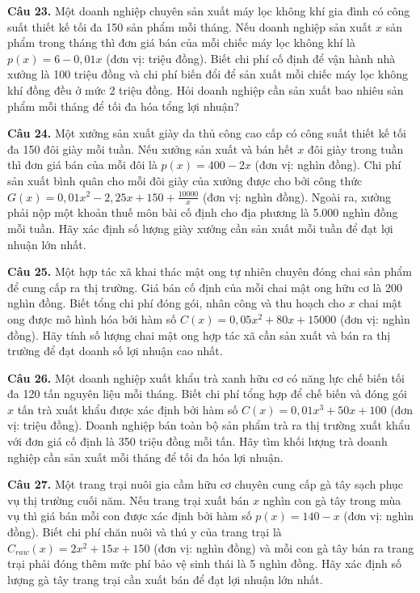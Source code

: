 \documentclass[12pt]{article}
\begin{document}
	\vspace{0.6cm}
	\noindent \textbf{Câu 23.} Một doanh nghiệp chuyên sản xuất máy lọc không khí gia đình có công suất thiết kế tối đa 150 sản phẩm mỗi tháng. Nếu doanh nghiệp sản xuất $x$ sản phẩm trong tháng thì đơn giá bán của mỗi chiếc máy lọc không khí là $p(x) = 6 - 0,01x$ (đơn vị: triệu đồng). Biết chi phí cố định để vận hành nhà xưởng là 100 triệu đồng và chi phí biến đổi để sản xuất mỗi chiếc máy lọc không khí đồng đều ở mức 2 triệu đồng. Hỏi doanh nghiệp cần sản xuất bao nhiêu sản phẩm mỗi tháng để tối đa hóa tổng lợi nhuận?
	
	\vspace{0.6cm}
	\noindent \textbf{Câu 24.} Một xưởng sản xuất giày da thủ công cao cấp có công suất thiết kế tối đa 150 đôi giày mỗi tuần. Nếu xưởng sản xuất và bán hết $x$ đôi giày trong tuần thì đơn giá bán của mỗi đôi là $p(x) = 400 - 2x$ (đơn vị: nghìn đồng). Chi phí sản xuất bình quân cho mỗi đôi giày của xưởng được cho bởi công thức $G(x) = 0,01x^2 - 2,25x + 150 + \frac{10000}{x}$ (đơn vị: nghìn đồng). Ngoài ra, xưởng phải nộp một khoản thuế môn bài cố định cho địa phương là 5.000 nghìn đồng mỗi tuần. Hãy xác định số lượng giày xưởng cần sản xuất mỗi tuần để đạt lợi nhuận lớn nhất.
	
	\vspace{0.6cm}
	\noindent \textbf{Câu 25.} Một hợp tác xã khai thác mật ong tự nhiên chuyên đóng chai sản phẩm để cung cấp ra thị trường. Giá bán cố định của mỗi chai mật ong hữu cơ là 200 nghìn đồng. Biết tổng chi phí đóng gói, nhân công và thu hoạch cho $x$ chai mật ong được mô hình hóa bởi hàm số $C(x) = 0,05x^2 + 80x + 15000$ (đơn vị: nghìn đồng). Hãy tính số lượng chai mật ong hợp tác xã cần sản xuất và bán ra thị trường để đạt doanh số lợi nhuận cao nhất.
	
	\vspace{0.6cm}
	\noindent \textbf{Câu 26.} Một doanh nghiệp xuất khẩu trà xanh hữu cơ có năng lực chế biến tối đa 120 tấn nguyên liệu mỗi tháng. Biết chi phí tổng hợp để chế biến và đóng gói $x$ tấn trà xuất khẩu được xác định bởi hàm số $C(x) = 0,01x^3 + 50x + 100$ (đơn vị: triệu đồng). Doanh nghiệp bán toàn bộ sản phẩm trà ra thị trường xuất khẩu với đơn giá cố định là 350 triệu đồng mỗi tấn. Hãy tìm khối lượng trà doanh nghiệp cần sản xuất mỗi tháng để tối đa hóa lợi nhuận.
	
	\vspace{0.6cm}
	\noindent \textbf{Câu 27.} Một trang trại nuôi gia cầm hữu cơ chuyên cung cấp gà tây sạch phục vụ thị trường cuối năm. Nếu trang trại xuất bán $x$ nghìn con gà tây trong mùa vụ thì giá bán mỗi con được xác định bởi hàm số $p(x) = 140 - x$ (đơn vị: nghìn đồng). Biết chi phí chăn nuôi và thú y của trang trại là $C_{raw}(x) = 2x^2 + 15x + 150$ (đơn vị: nghìn đồng) và mỗi con gà tây bán ra trang trại phải đóng thêm mức phí bảo vệ sinh thái là 5 nghìn đồng. Hãy xác định số lượng gà tây trang trại cần xuất bán để đạt lợi nhuận lớn nhất.
	
\end{document}
